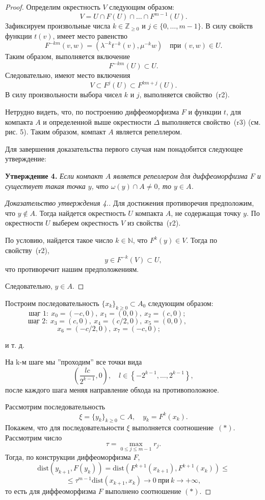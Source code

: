 \documentclass[12pt]{article}
\begin{document}
\begin{proof}
Определим окрестность $V$ следующим образом:
$$V=U\cap F(U)\cap\ldots\cap F^{m-1}(U).$$
Зафиксируем произвольные числа $k\!\in\!\mathbb{Z}_{\geq 0}$ и $j\!\in\!\{ 0,\ldots, m-1\}$. %
В силу свойств функции $t(v)$, имеет место равенство
$$F^{-km}(v,w)=\left(\lambda^{-k} t^{-k}(v),\mu^{-k} w\right)\quad \textrm{при}\ (v,w)\in U.$$
Таким образом, выполняется включение $$F^{-km}(U)\subset U.$$
Следовательно, имеют место включения
$$V\subset F^j(U)\subset F^{km+j}(U).$$
В силу произвольности выбора чисел $k$ и $j$, выполняется свойство~(r2).

Нетрудно видеть, что, по построению диффеоморфизма $F$ и функции $t$, для компакта $A$ и определенной выше окрестности $\Delta$ выполняется свойс\-тво~(r3) (см. рис. 5).
Таким образом, компакт $A$ является репеллером.

Для завершения доказательства первого случая нам понадобится следующее утверждение:

\textbf{Утверждение 4.} \textit{Если компакт $A$ является репеллером для диффеоморфизма $F$ и сущес\-твует такая точка $y$, что $\omega(y)\cap A\neq 0$, то $y\in A$.}

\begin{proof}[Доказательство утверждения 4.] Для достижения противоречия пред\-положим, что $y\notin A$. Тогда найдется окрестность $U$ компакта $A$, не содержащая точку $y$. По окрестности $U$ выберем окрестность $V$ из свойства~(r2).

По условию, найдется такое число $k\!\in\!\mathbb{N}$, что $F^k(y)\!\in\! V$. 
Тогда по свойству~(r2),
$$y\in F^{-k}(V)\subset U,$$
что противоречит нашим предположениям.

Следовательно, $y\!\in\! A$. %
\end{proof}

Построим последовательность $\{x_k\}_{k\geq 0}\subset A_0$ следующим образом:
$$\underline{\textrm{шаг 1}}:\ x_0=(-c,0),\ x_1=(0,0),\ x_2=(c,0);\ \ \ \ \ \ \ \ \ \ \  \ \ \ \ \ \ \ \ \ \ \ \ \ \ \ \ \ \ \ \ \ \ $$
$$\underline{\textrm{шаг 2}}:\ x_3=(c,0),\ x_4=(c/2,0),\ x_5=(0,0),\ \ \ \ \ \ \ \ \ \ \  \ \ \ \ \ \ \ \ \ \ \ \ \ \ \ \ \ \ \ \ \ \ $$
$$x_6=(-c/2,0),\ x_7=(-c,0);\ \ \ \ \ \ \ \ \ \ \  \ \ \ \ \ \ \ \ \ \ \ \ \ \ \ \ \ \ \ \ $$
\centerline{и т. д.}
На k-м шаге мы ''проходим'' все точки вида 
$$\left(\frac{lc}{2^{k-1}},0\right),\quad l\in\left\{-2^{k-1},\ldots,2^{k-1}\right\},$$
после каждого шага меняя направление обхода на противополож\nobreak ное.

Рассмотрим последовательность 
  $$\xi=\{y_k\}_{k\geq0}\subset A,\quad y_k=F^k(x_k).$$
Покажем, что для последовательности $\xi$ выполняется соотношение~$(*)$.
Рассмотрим число
$$\tau=\max_{0\leq j\leq m-1}r_j.$$
Тогда, по конструкции диффеоморфизма $F$,
$$\textrm{dist}(y_{k+1},F(y_k))=\textrm{dist}(F^{k+1}(x_{k+1}),F^{k+1}(x_{k}))\leq$$
$$\leq \tau^{m-1}\textrm{dist}(x_{k+1},x_{k})\longrightarrow0\ \textrm{при}\ k\rightarrow+\infty,$$
то есть для диффеоморфизма $F$ выполнено соотношение $(*)$.


\end{proof}
\end{document}
